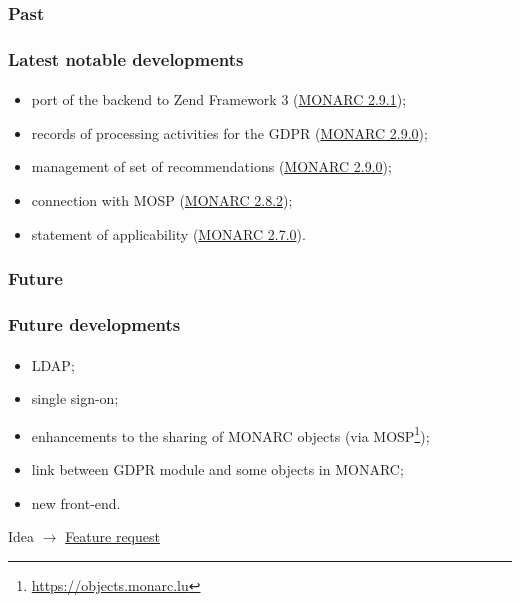 \subsubsection{Past}
\begin{frame}
    \frametitle{Latest notable developments}
    \framesubtitle{}
    \begin{itemize}
        \item port of the backend to Zend Framework 3 (\href{https://www.monarc.lu/news/2019/11/25/monarc-291-released/}{MONARC 2.9.1});
        \item records of processing activities for the GDPR (\href{https://www.monarc.lu/news/2019/08/23/monarc-290-released/}{MONARC 2.9.0});
        \item management of set of recommendations (\href{https://www.monarc.lu/news/2019/08/23/monarc-290-released/}{MONARC 2.9.0});
        \item connection with MOSP (\href{https://www.monarc.lu/news/2019/05/28/monarc-282-released/}{MONARC 2.8.2});
        \item statement of applicability (\href{https://www.monarc.lu/news/2018/08/22/monarc-270-released/}{MONARC 2.7.0}).
    \end{itemize}
\end{frame}

\subsubsection{Future}
\begin{frame}
    \frametitle{Future developments}
    \framesubtitle{}
    \begin{itemize}
        \item LDAP;
        \item single sign-on;
        \item enhancements to the sharing of MONARC objects (via MOSP\footnote{\url{https://objects.monarc.lu}});
        \item link between GDPR module and some objects in MONARC;
        \item new front-end.
    \end{itemize}
    \bigskip
    Idea
    $\rightarrow$
    \href{https://github.com/monarc-project/MonarcAppFO/issues/new?labels=feature+request}{Feature request}
\end{frame}
